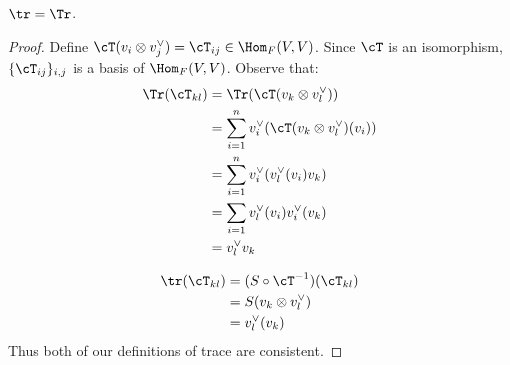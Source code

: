     \begin{proposition}
        $\tr = \Tr$. 
    \end{proposition}
        \begin{proof}
            Define $\cT(v_i \otimes v_j^\vee) = \cT_{ij} \in \Hom_F(V,V)$. Since $\cT$ is an isomorphism, $\{\cT_{ij}\}_{i,j}$ is a basis of $\Hom_F(V,V)$. Observe that:
                \begin{equation*}
                \begin{split}
                    \Tr(\cT_{kl})
                    & = \Tr(\cT(v_k \otimes v_l^\vee)) \\
                    & = \sum_{i = 1}^n v_i^\vee (\cT(v_k \otimes v_l^\vee)(v_i)) \\
                    & = \sum_{i = 1}^n v_i^\vee (v_l^\vee (v_i)v_k) \\
                    & = \sum_{i = 1}v_l^\vee(v_i)v_i^\vee(v_k) \\
                    & = v_l^\vee v_k
                \end{split}
                \end{equation*}

                \begin{equation*}
                \begin{split}
                    \tr(\cT_{kl})
                    & = (S \circ \cT^{-1})(\cT_{kl}) \\
                    & = S(v_k \otimes v_l^\vee) \\
                    & = v_l^\vee (v_k)
                \end{split}
                \end{equation*}
            Thus both of our definitions of trace are consistent.
        \end{proof}

